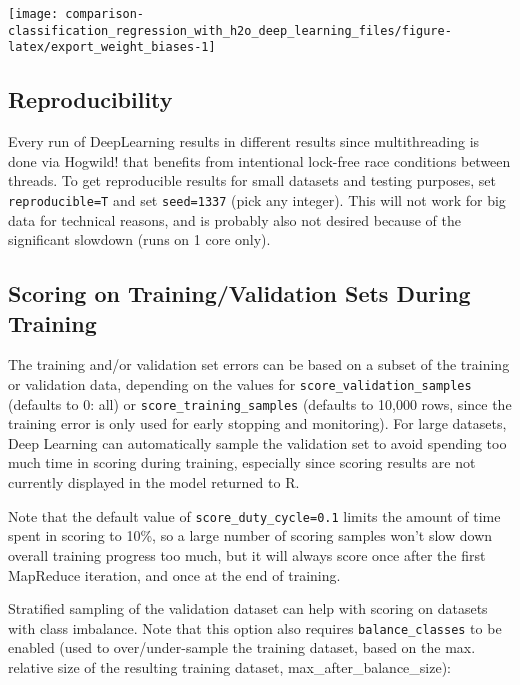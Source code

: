 \documentclass[]{book}
\begin{document}
\begin{center}\texttt{[image: comparison-classification\_regression\_with\_h2o\_deep\_learning\_files/figure-latex/export\_weight\_biases-1]} \end{center}

\hypertarget{reproducibility}{%
\subsection{Reproducibility}\label{reproducibility}}

Every run of DeepLearning results in different results since multithreading is done via Hogwild! that benefits from intentional lock-free race conditions between threads. To get reproducible results for small datasets and testing purposes, set \texttt{reproducible=T} and set \texttt{seed=1337} (pick any integer). This will not work for big data for technical reasons, and is probably also not desired because of the significant slowdown (runs on 1 core only).

\hypertarget{scoring-on-trainingvalidation-sets-during-training}{%
\subsection{Scoring on Training/Validation Sets During Training}\label{scoring-on-trainingvalidation-sets-during-training}}

The training and/or validation set errors can be based on a subset of the training or validation data, depending on the values for \texttt{score\_validation\_samples} (defaults to 0: all) or \texttt{score\_training\_samples} (defaults to 10,000 rows, since the training error is only used for early stopping and monitoring). For large datasets, Deep Learning can automatically sample the validation set to avoid spending too much time in scoring during training, especially since scoring results are not currently displayed in the model returned to R.

Note that the default value of \texttt{score\_duty\_cycle=0.1} limits the amount of time spent in scoring to 10\%, so a large number of scoring samples won't slow down overall training progress too much, but it will always score once after the first MapReduce iteration, and once at the end of training.

Stratified sampling of the validation dataset can help with scoring on datasets with class imbalance. Note that this option also requires \texttt{balance\_classes} to be enabled (used to over/under-sample the training dataset, based on the max. relative size of the resulting training dataset, max\_after\_balance\_size):
\end{document}
